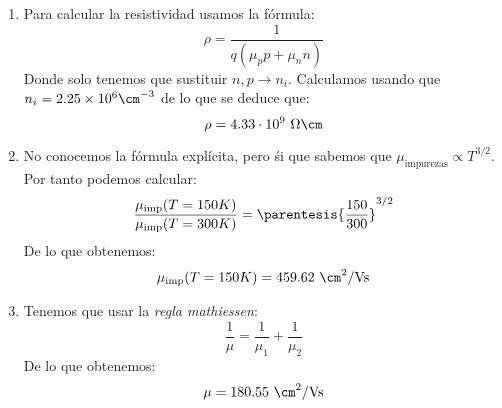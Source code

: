 	\begin{enumerate}[label=\alph*)]
		\item Para calcular la resistividad usamos la fórmula:
		\begin{equation}
			\rho = \frac{1}{q(\mu_p p + \mu_n n )}
		\end{equation}
		Donde solo tenemos que sustituir $n,p\rightarrow n_i$. Calculamos usando que $n_i= 2.25\times 10^6 \cm^{-3}$ de lo que se deduce que:
		\begin{equation}
		\rho =4.33\cdot 10^9 \ \Omega \cm
		\end{equation}
		\item No conocemos la fórmula explícita, pero śi que sabemos que $\mu_{\text{impurezas}}\propto T^{3/2}$. Por tanto podemos calcular:
		\begin{equation}
			\frac{\mu_{\text{imp}} (T=150K)}{\mu_{\text{imp}}(T=300K)} = \parentesis{\frac{150}{300}}^{3/2}		
		\end{equation}
		De lo que obtenemos:
		\begin{equation}
			\mu_{\text{imp}} (T=150K) = 459.62 \ \cm^2 / \text{Vs}
		\end{equation}
		\item Tenemos que usar la \textit{regla mathiessen}:
		\begin{equation}
			\frac{1}{\mu} = \frac{1}{\mu_{1}}+\frac{1}{\mu_{2}}
		\end{equation}
		De lo que obtenemos:		
		\begin{equation}
			\mu = 180.55 \ \cm^2 / \text{Vs}
		\end{equation}
	\end{enumerate}
